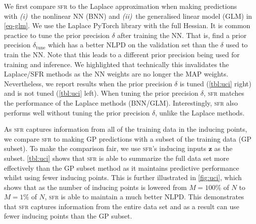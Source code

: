 \documentclass{article}
\newcommand{\our}{\textsc{sfr}\xspace}
\newcommand{\mbf}[1]{\mathbf{#1}}
\newcommand{\vz}{\mbf{z}}
\begin{document}
We first compare \our to the Laplace approximation when making predictions with {\em (i)}~the nonlinear NN (BNN) and {\em (ii)}~the generalised linear model (GLM) in \cref{eq-glm}.
We use the Laplace PyTorch library \citep{daxberger2021laplace} with the full Hessian. %
It is common practice to tune the prior precision $\delta$ after training the NN.
That is, find a prior precision $\delta_{\text{tune}}$ which has a better NLPD on the validation set than the $\delta$ used to train the NN.
Note that this leads to a different prior precision being used for training and inference.
We highlighted that technically this invalidates the Laplace/SFR methods as the NN weights are no longer the MAP weights.
Nevertheless, we report results when the prior precision $\delta$ is tuned (\cref{tbl:uci} right) and is not tuned (\cref{tbl:uci} left).
When tuning the prior precision $\delta$, \our matches the performance of the Laplace methods (BNN/GLM).
Interestingly, \our also  performs well without tuning the prior precision $\delta$, unlike the Laplace methods.

As \our captures information from all of the training data in the inducing points, we compare \our to making GP predictions with a subset of the training data (GP subset).
To make the comparison fair, we use \our's inducing inputs $\vz$ as the subset.
\cref{tbl:uci} shows that \our is able to summarize the full data set more effectively than the GP subset method as it maintains predictive performance
whilst using fewer inducing points.
This is further illustrated in \cref{fig:uci}, which shows that as the number of inducing points is lowered from $M=100\%$ of $N$ to $M=1\%$ of $N$,
\our is able to maintain a much better NLPD.
This demonstrates that \our  captures information from the entire data set and as a result can use fewer inducing points than the GP subset.

\end{document}
